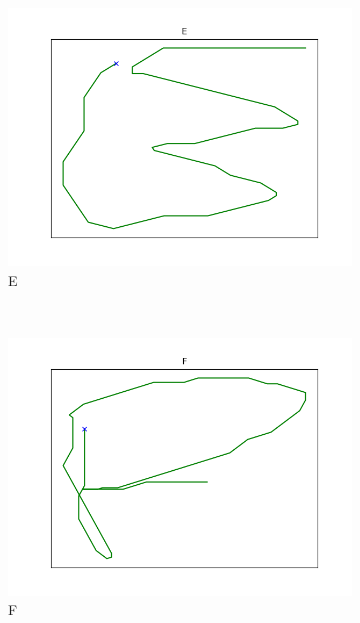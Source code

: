 \begin{figure}
\begin{subfigure}[b]{0.14\textwidth}
        \includegraphics[width=\textwidth]{images/gbem/orig_letters_fig/AORIG_letter_E_writer_6.png}
        \caption{E}
    \end{subfigure}
    ~
    \begin{subfigure}[b]{0.14\textwidth}
        \includegraphics[width=\textwidth]{images/gbem/orig_letters_fig/AORIG_letter_F_writer_4.png}
        \caption{F}
    \end{subfigure}
    ~
    \begin{subfigure}[b]{0.14\textwidth}

\end{subfigure}
\end{figure}
